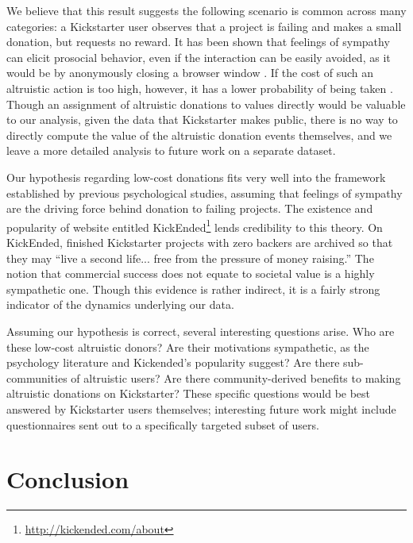 \documentclass[letterpaper]{article}
\begin{document}
We believe that this result suggests the following scenario is common across many categories: a Kickstarter user observes that a project is failing and makes a small donation, but requests no reward. It has been shown that feelings of sympathy can elicit prosocial behavior, even if the interaction can be easily avoided, as it would be by anonymously closing a browser window \cite{eisenberg1989relation}. If the cost of such an altruistic action is too high, however, it has a lower probability of being taken \cite{batson1983influence}. Though an assignment of altruistic donations to values directly would be valuable to our analysis, given the data that Kickstarter makes public, there is no way to directly compute the value of the altruistic donation events themselves, and we leave a more detailed analysis to future work on a separate dataset.

Our hypothesis regarding low-cost donations fits very well into the framework established by previous psychological studies, assuming that feelings of sympathy are the driving force behind donation to failing projects. The existence and popularity of website entitled KickEnded\footnote{\url{http://kickended.com/about}} lends credibility to this theory. On KickEnded, finished Kickstarter projects with zero backers are archived so that they may ``live a second life... free from the pressure of money raising.'' The notion that commercial success does not equate to societal value is a highly sympathetic one. Though this evidence is rather indirect, it is a fairly strong indicator of the dynamics underlying our data.

Assuming our hypothesis is correct, several interesting questions arise. Who are these low-cost altruistic donors? Are their motivations sympathetic, as the psychology literature and Kickended's popularity suggest? Are there sub-communities of altruistic users? Are there community-derived benefits to making altruistic donations on Kickstarter? These specific questions would be best answered by Kickstarter users themselves; interesting future work might include questionnaires sent out to a specifically targeted subset of users.

\section{Conclusion}
\end{document}
